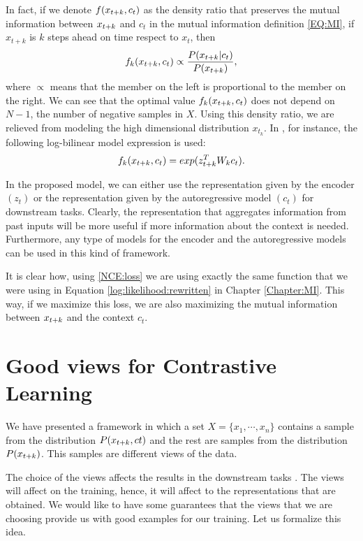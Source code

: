 In fact, if we denote $f(x_{t+k},c_t)$  as the density ratio that preserves the mutual information between $x_{t+k}$ and $c_t$ in the mutual information definition \eqref{EQ:MI}, if $x_{t+k}$ is $k$ steps ahead on time respect to $x_t$, then
\begin{equation}\label{EQ:Proportional}
f_k(x_{t+k},c_t)  \propto \frac{P(x_{t+k}| c_t)}{P(x_{t+k})},
\end{equation}
where $\propto$ means that the member on the left is proportional to the member on the right. We can see that the optimal value $f_k(x_{t+k},c_t)$ does not depend on $N-1$, the number of negative samples in $X$.
Using this density ratio, we are relieved from modeling the high dimensional distribution $x_{t_k}$. In \cite{oord_representation_2019}, for instance, the following log-bilinear model expression is used:
$$
f_k(x_{t+k},c_t) = exp(z_{t+k}^T W_k c_t).
$$


In the proposed model, we can either use the representation given by the encoder $(z_t)$ or the representation given by the autoregressive model $(c_t)$ for downstream tasks. Clearly, the representation that aggregates information from past inputs will be more useful
if more information about the context is needed. Furthermore, any type of models for the encoder and the autoregressive models can be used in this kind of framework.

It is clear how, using \eqref{NCE:loss} we are using exactly the same function that we were using in Equation \ref{log:likelihood:rewritten} in Chapter \ref{Chapter:MI}. This way, if we maximize this loss, we are also maximizing the mutual information between $x_{t+k}$ and the context $c_t$.

\section{Good views for Contrastive Learning}

We have presented a framework in which a set $X = \{x_1,\cdots,x_n\}$ contains a sample from the distribution $P(x_{t+k},ct)$ and the rest are samples from the distribution $P(x_{t+k})$. This samples are different views of the data. 

The choice of the views affects the results in the downstream tasks \citep{tian_what_2020}. The views will affect on the training, hence, it will affect to the representations that are obtained. We would like to have some guarantees that the views that we are choosing provide us with good examples for our training. Let us formalize this idea.

